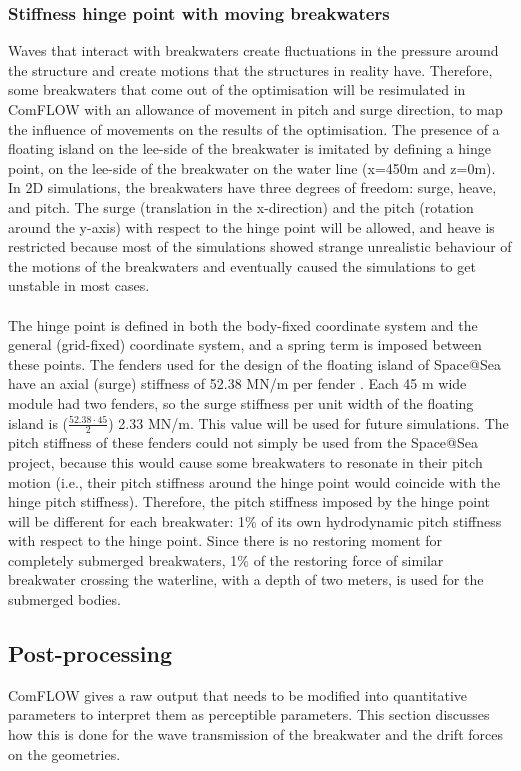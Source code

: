 \subsubsection{Stiffness hinge point with moving breakwaters}
Waves that interact with breakwaters create fluctuations in the pressure around the structure and create motions that the structures in reality have. Therefore, some breakwaters that come out of the optimisation will be resimulated in ComFLOW with an allowance of movement in pitch and surge direction, to map the influence of movements on the results of the optimisation. The presence of a floating island on the lee-side of the breakwater is imitated by defining a hinge point, on the lee-side of the breakwater on the water line (x=450m and z=0m). In 2D simulations, the breakwaters have three degrees of freedom: surge, heave, and pitch. The surge (translation in the x-direction) and the pitch (rotation around the y-axis) with respect to the hinge point will be allowed, and heave is restricted because most of the simulations showed strange unrealistic behaviour of the motions of the breakwaters and eventually caused the simulations to get unstable in most cases. \\
\\
The hinge point is defined in both the body-fixed coordinate system and the general (grid-fixed) coordinate system, and a spring term is imposed between these points. The fenders used for the design of the floating island of Space@Sea have an axial (surge) stiffness of 52.38 MN/m  per fender \citep{S@S_demonstationatwavetank}. Each 45 m wide module had two fenders, so the surge stiffness per unit width of the floating island is ($\frac{52.38 \cdot 45}{2}$) 2.33 MN/m. This value will be used for future simulations. The pitch stiffness of these fenders could not simply be used from the Space@Sea project, because this would cause some breakwaters to resonate in their pitch motion (i.e., their pitch stiffness around the hinge point would coincide with the hinge pitch stiffness). Therefore, the pitch stiffness imposed by the hinge point will be different for each breakwater: 1\% of its own hydrodynamic pitch stiffness with respect to the hinge point. Since there is no restoring moment for completely submerged breakwaters, 1\% of the restoring force of similar breakwater crossing the waterline, with a depth of two meters, is used for the submerged bodies. 




\subsection{Post-processing}
\label{sec: post processing by Python}
ComFLOW gives a raw output that needs to be modified into quantitative parameters to interpret them as perceptible parameters. This section discusses how this is done for the wave transmission of the breakwater and the drift forces on the geometries.




